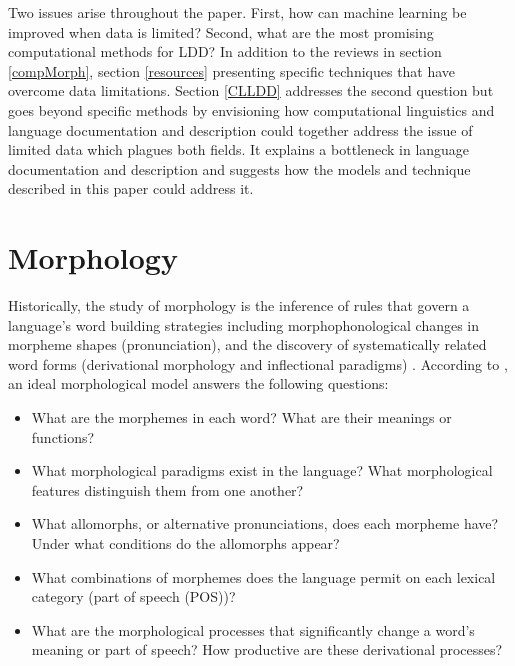 \documentclass[12pt]{article}
\begin{document}
Two issues arise throughout the paper. First, how can machine learning be improved when data is limited? Second, what are the most promising computational methods for LDD? In addition to the reviews in section \ref{compMorph}, section \ref{resources} presenting specific techniques that have overcome data limitations. Section \ref{CLLDD} addresses the second question but goes beyond specific methods by envisioning how computational linguistics and language documentation and description could together address the issue of limited data which plagues both fields. It explains a bottleneck in language documentation and description and suggests how the models and technique described in this paper could address it.

\section{Morphology}
\label{tasks}

Historically, the study of morphology is the inference of rules that govern a language’s word building strategies including morphophonological changes in morpheme shapes (pronunciation), and the discovery of systematically related word forms (derivational morphology and inflectional paradigms) \cite{roark_computational_2007}. According to , an ideal morphological model answers the following questions:\begin{singlespace}

\smallskip
\begin{itemize}
    \item What are the morphemes in each word? What are their meanings or functions? 
    \item What morphological paradigms exist in the language? What morphological features distinguish them from one another?
    \item What allomorphs, or alternative pronunciations, does each morpheme have? Under what conditions do the allomorphs appear?  
    \item What combinations of morphemes does the language permit on each lexical category (part of speech (POS))?
    \item What are the morphological processes that significantly change a word's meaning or part of speech? How productive are these derivational processes?
\end{itemize}
\end{singlespace}
\smallskip
\end{document}
